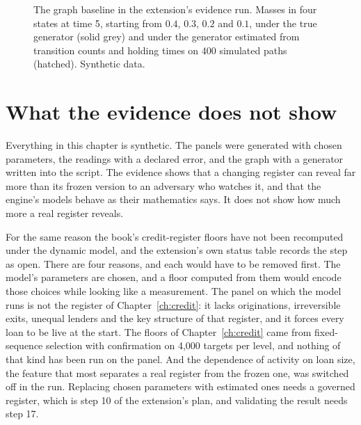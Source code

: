 \begin{figure}[ht]
\centering
{}
\caption{The graph baseline in the extension's evidence run. Masses in four states at time 5,
starting from $0.4$, $0.3$, $0.2$ and $0.1$, under the true generator (solid grey) and under the generator
estimated from transition counts and holding times on 400 simulated paths (hatched). Synthetic
data.}
\label{c19:fig-graph}
\end{figure}

\section{What the evidence does not show}

Everything in this chapter is synthetic. The panels were generated with chosen parameters,
the readings with a declared error, and the graph with a generator written into the script.
The evidence shows that a changing register can reveal far more than its frozen version to
an adversary who watches it, and that the engine's models behave as their mathematics says.
It does not show how much more a real register reveals.

For the same reason the book's credit-register floors have not been recomputed under
the dynamic model, and the extension's own status table records the step as open. There
are four reasons, and each would have to be removed first. The model's parameters are
chosen, and a floor computed from them would encode those choices while looking like a
measurement. The panel on which the model runs is not the register of Chapter~\ref{ch:credit}: it lacks
originations, irreversible exits, unequal lenders and the key structure of that register, and it
forces every loan to be live at the start. The floors of Chapter~\ref{ch:credit} came from fixed-sequence
selection with confirmation on 4,000 targets per level, and nothing of that kind has been run
on the panel. And the dependence of activity on loan size, the feature that most separates a
real register from the frozen one, was switched off in the run. Replacing chosen parameters
with estimated ones needs a governed register, which is step 10 of the extension's plan, and
validating the result needs step 17.

